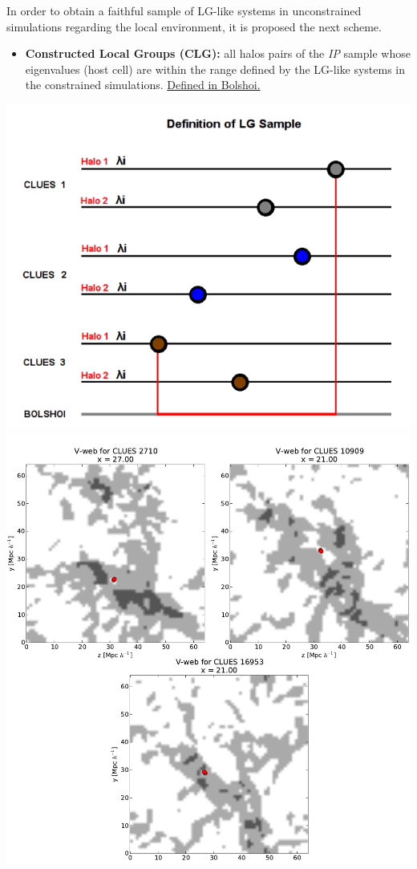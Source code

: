 \documentclass[8pt,fleqn]{beamer}
\begin{document}
\begin{frame}
\begin{tcolorbox}[colback=white!5,colframe=black!75!black,title=Defining the Samples]\justifying

	In order to obtain a faithful sample of LG-like systems in unconstrained
	simulations regarding the local environment, it is proposed the next 
	scheme.

	\begin{small}	
	\begin{itemize}
	\justifying
	\color{black}
	\item \textbf{Constructed Local Groups (CLG):} all halos pairs of the \textit{IP} 
	sample whose eigenvalues (host cell) are within the range defined by the
	LG-like systems in the constrained simulations. \underline{Defined in Bolshoi.}
	\end{itemize}

	\begin{center}
	\includegraphics[trim = 5mm 5mm 5mm 15mm, clip, width=.6\textwidth]
	{./figures/LG_definition.png}
	\includegraphics[trim = 0mm 0mm 0mm 0mm, clip, width=.4\textwidth]
	{./figures/LG_Environment.png}
	\end{center}
	
	\end{small}

\end{tcolorbox}
\end{frame}
\end{document}
